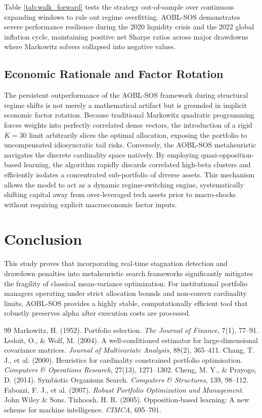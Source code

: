 \documentclass[11pt,a4paper]{article}
\begin{document}
Table \ref{tab:walk_forward} tests the strategy out-of-sample over continuous expanding windows to rule out regime overfitting. AOBL-SOS demonstrates severe performance resilience during the 2020 liquidity crisis and the 2022 global inflation cycle, maintaining positive net Sharpe ratios across major drawdowns where Markowitz solvers collapsed into negative values.

\subsection{Economic Rationale and Factor Rotation}
The persistent outperformance of the AOBL-SOS framework during structural regime shifts is not merely a mathematical artifact but is grounded in implicit economic factor rotation. Because traditional Markowitz quadratic programming forces weights into perfectly correlated dense vectors, the introduction of a rigid $K=30$ limit arbitrarily slices the optimal allocation, exposing the portfolio to uncompensated idiosyncratic tail risks. Conversely, the AOBL-SOS metaheuristic navigates the discrete cardinality space natively. By employing quasi-opposition-based learning, the algorithm rapidly discards correlated high-beta clusters and efficiently isolates a concentrated sub-portfolio of diverse assets. This mechanism allows the model to act as a dynamic regime-switching engine, systematically shifting capital away from over-leveraged tech assets prior to macro-shocks without requiring explicit macroeconomic factor inputs.

\section{Conclusion}
This study proves that incorporating real-time stagnation detection and drawdown penalties into metaheuristic search frameworks significantly mitigates the fragility of classical mean-variance optimization. For institutional portfolio managers operating under strict allocation bounds and non-convex cardinality limits, AOBL-SOS provides a highly stable, computationally efficient tool that robustly preserves alpha after execution costs are processed.

\begin{thebibliography}{99}
 Markowitz, H. (1952). Portfolio selection. \textit{The Journal of Finance}, 7(1), 77--91.
 Ledoit, O., \& Wolf, M. (2004). A well-conditioned estimator for large-dimensional covariance matrices. \textit{Journal of Multivariate Analysis}, 88(2), 365--411.
 Chang, T. J., et al. (2000). Heuristics for cardinality constrained portfolio optimisation. \textit{Computers \& Operations Research}, 27(13), 1271--1302.
 Cheng, M. Y., \& Prayogo, D. (2014). Symbiotic Organisms Search. \textit{Computers \& Structures}, 139, 98--112.
 Fabozzi, F. J., et al. (2007). \textit{Robust Portfolio Optimization and Management}. John Wiley \& Sons.
 Tizhoosh, H. R. (2005). Opposition-based learning: A new scheme for machine intelligence. \textit{CIMCA}, 695--701.
\end{thebibliography}
\end{document}
